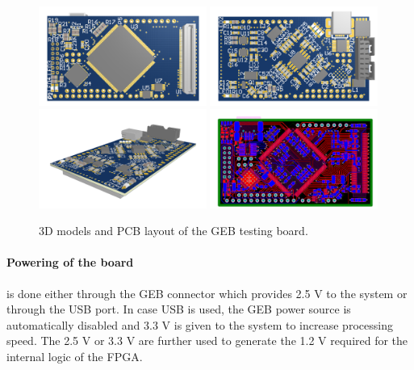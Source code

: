       \begin{figure}[t!]
        \centering
        \includegraphics[width=0.49\textwidth]{img/II-4-qualification/geb-3d-0.png}
        \includegraphics[width=0.49\textwidth]{img/II-4-qualification/geb-3d-1.png}
        \vspace*{0.3cm}
        \includegraphics[width=0.49\textwidth]{img/II-4-qualification/geb-3d-2.png}
        \includegraphics[width=0.49\textwidth]{img/II-4-qualification/geb-pcb.png}
        \caption{3D models and PCB layout of the GEB testing board.}
        \label{fig:II-4-geb-pcb}
      \end{figure}

      \paragraph{Powering of the board} is done either through the GEB connector which provides 2.5 V to the system or through the USB port. In case USB is used, the GEB power source is automatically disabled and 3.3 V is given to the system to increase processing speed. The 2.5 V or 3.3 V are further used to generate the 1.2 V required for the internal logic of the FPGA.

